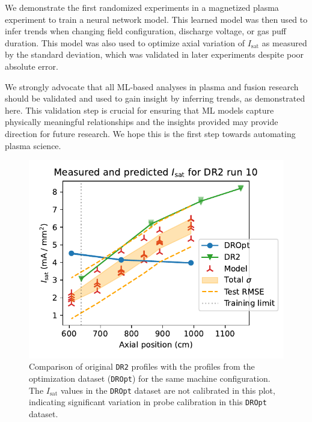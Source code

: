 We demonstrate the first randomized experiments in a magnetized plasma experiment to train a neural network model. This learned model was then used to infer trends when changing field configuration, discharge voltage, or gas puff duration. This model was also used to optimize axial variation of $I_\text{sat}$ as measured by the standard deviation, which was validated in later experiments despite poor absolute error. 

We strongly advocate that all ML-based analyses in plasma and fusion research should be validated  and used to gain insight by inferring trends, as demonstrated here. This validation step is crucial for ensuring that ML models capture physically meaningful relationships and the insights provided may provide direction for future research. We hope this is the first step towards automating plasma science.


\begin{figure}
	\includegraphics[width=\columnwidth]{figures/DR2-10_LHS-30_valdiation.pdf}
	\caption[size=12]{\label{fig:DR2-10_LHS-30_valdiation}Comparison of original \texttt{DR2} profiles with the profiles from the optimization dataset (\texttt{DROpt}) for the same machine configuration. The $I_\text{sat}$ values in the \texttt{DROpt} dataset are not calibrated in this plot, indicating significant variation in probe calibration in this \texttt{DROpt} dataset.}
\end{figure}


